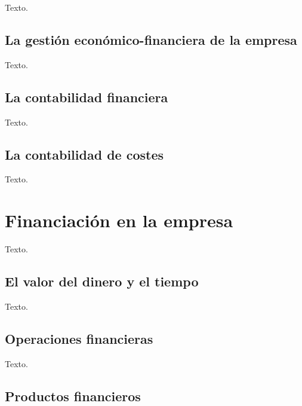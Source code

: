 \documentclass[
]{krantz}
\begin{document}
Texto.

\hypertarget{la-gestiuxf3n-econuxf3mico-financiera-de-la-empresa}{%
\section{La gestión económico-financiera de la empresa}\label{la-gestiuxf3n-econuxf3mico-financiera-de-la-empresa}}

Texto.

\hypertarget{la-contabilidad-financiera}{%
\section{La contabilidad financiera}\label{la-contabilidad-financiera}}

Texto.

\hypertarget{la-contabilidad-de-costes}{%
\section{La contabilidad de costes}\label{la-contabilidad-de-costes}}

Texto.

\hypertarget{financiaciuxf3n-en-la-empresa}{%
\chapter{Financiación en la empresa}\label{financiaciuxf3n-en-la-empresa}}

Texto.

\hypertarget{el-valor-del-dinero-y-el-tiempo}{%
\section{El valor del dinero y el tiempo}\label{el-valor-del-dinero-y-el-tiempo}}

Texto.

\hypertarget{operaciones-financieras}{%
\section{Operaciones financieras}\label{operaciones-financieras}}

Texto.

\hypertarget{productos-financieros}{%
\section{Productos financieros}\label{productos-financieros}}
\end{document}
